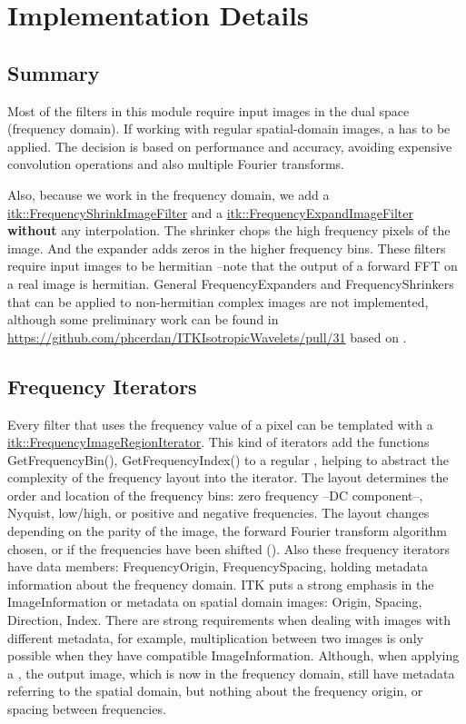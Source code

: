 \documentclass{InsightArticle}
\newcommand{\github}[1]{\href{https://github.com/phcerdan/ITKIsotropicWavelets/blob/master/include/itk#1.h}{itk::#1}}
\theoremstyle{definition}
\begin{document}
\section{Implementation Details}
\label{sec:Impl}
\subsection{Summary}
\label{sub:Summary}

Most of the filters in this module require input images in the dual space (frequency domain). If working with regular spatial-domain images, a  has to be applied. The decision is based on performance and accuracy, avoiding expensive convolution operations and also multiple Fourier transforms.

Also, because we work in the frequency domain, we add a \github{FrequencyShrinkImageFilter} and a \github{FrequencyExpandImageFilter} \textbf{without} any interpolation. The shrinker chops the high frequency pixels of the image. And the expander adds zeros in the higher frequency bins.
These filters require input images to be hermitian --note that the output of a forward FFT on a real image is hermitian.\newline
General FrequencyExpanders and FrequencyShrinkers that can be applied to non-hermitian complex images are not implemented, although some preliminary work can be found in \url{https://github.com/phcerdan/ITKIsotropicWavelets/pull/31} based on \cite{portilla_image_2003}.

\subsection{Frequency Iterators}
\label{sub:frequencyiterators}
Every filter that uses the frequency value of a pixel can be templated with a \github{FrequencyImageRegionIterator}.\newline
This kind of iterators add the functions GetFrequencyBin(), GetFrequencyIndex() to a regular , helping to abstract the complexity of the frequency layout into the iterator.
The layout determines the order and location of the frequency bins: zero frequency --DC component--, Nyquist, low/high, or positive and negative frequencies. The layout changes depending on the parity of the image, the forward Fourier transform algorithm chosen, or if the frequencies have been shifted ().\newline
Also these frequency iterators have data members: FrequencyOrigin, FrequencySpacing, holding metadata information about the frequency domain.\newline
ITK puts a strong emphasis in the ImageInformation or metadata on spatial domain images: Origin, Spacing, Direction, Index. There are strong requirements when dealing with images with different metadata, for example, multiplication between two images is only possible when they have compatible ImageInformation.\newline
Although, when applying a , the output image, which is now in the frequency domain, still have metadata referring to the spatial domain, but nothing about the frequency origin, or spacing between frequencies.
\end{document}
